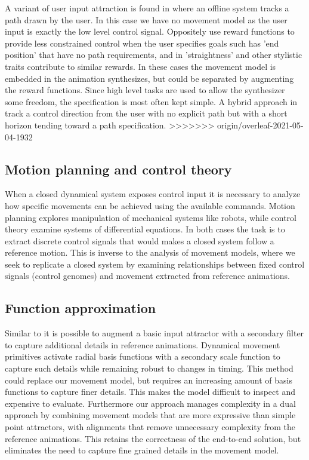 A variant of user input attraction is found in \citep{treuille07} where an offline system tracks a path drawn by the user. In this case we have no movement model as the user input is exactly the low level control signal. Oppositely \citep{kovar02} use reward functions to provide less constrained control when the user specifies goals such has 'end position' that have no path requirements, and in \citep{lee18} 'straightness' and other stylistic traits contribute to similar rewards. In these cases the movement model is embedded in the animation synthesizes, but could be separated by augmenting the reward functions. Since high level tasks are used to allow the synthesizer some freedom, the specification is most often kept simple. A hybrid approach in \citep{lee10} track a control direction from the user with no explicit path but with a short horizon tending toward a path specification.
>>>>>>> origin/overleaf-2021-05-04-1932

\subsection{Motion planning and control theory}
When a closed dynamical system exposes control input it is necessary to analyze how specific movements can be achieved using the available commands. Motion planning explores manipulation of mechanical systems like robots, while control theory examine systems of differential equations. In both cases the task is to extract discrete control signals that would makes a closed system follow a reference motion. This is inverse to the analysis of movement models, where we seek to replicate a closed system by examining relationships between fixed control signals (control genomes) and movement extracted from reference animations. 

\subsection{Function approximation}
Similar to \citep{startke20} it is possible to augment a basic input attractor with a secondary filter to capture additional details in reference animations. Dynamical movement primitives activate radial basis functions with a secondary scale function to capture such details while remaining robust to changes in timing. This method could replace our movement model, but requires an increasing amount of basis functions to capture finer details. This makes the model difficult to inspect and expensive to evaluate. Furthermore our approach manages complexity in a dual approach by combining movement models that are more expressive than simple point attractors, with alignments that remove unnecessary complexity from the reference animations. This retains the correctness of the end-to-end solution, but eliminates the need to capture fine grained details in the movement model.


